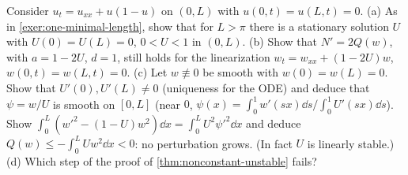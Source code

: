 \begin{exercise}[$\ast$]\label{exer:one-dirichlet}
Consider $u_t=u_{xx}+u(1-u)$ on $(0,L)$ with $u(0,t)=u(L,t)=0$. (a) As in
\cref{exer:one-minimal-length}, show that for $L>\pi$ there is a stationary solution
$U$ with $U(0)=U(L)=0$, $0<U<1$ in $(0,L)$. (b) Show that $N'=2Q(w)$, with $a=1-2U$,
$d=1$, still holds for the linearization $w_t=w_{xx}+(1-2U)w$, $w(0,t)=w(L,t)=0$.
(c) Let $w\not\equiv0$ be smooth with $w(0)=w(L)=0$. Show that $U'(0),U'(L)\neq0$
(uniqueness for the ODE) and deduce that $\psi=w/U$ is smooth on $[0,L]$ (near $0$,
$\psi(x)=\int_0^1w'(sx)\dd s/\int_0^1U'(sx)\dd s$). Show
$\int_0^L(w'^2-(1-U)w^2)\dd x=\int_0^LU^2\psi'^2\dd x$ and deduce
$Q(w)\le-\int_0^LUw^2\dd x<0$: no perturbation grows. (In fact $U$ is linearly
stable.) (d) Which step of the proof of \cref{thm:nonconstant-unstable} fails?
\end{exercise}
